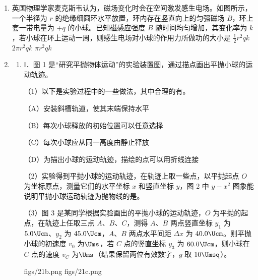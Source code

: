 \documentclass[\gkver]{gaokaozhenti}
\begin{document}
\begin{enumerate}
\item
英国物理学家麦克斯韦认为，磁场变化时会在空间激发感生电场。如图所示，一个半径为 $r$ 的绝缘细圆环水平放置，环内存在竖直向上的匀强磁场 $B$，环上套一带电量为 $+q$ 的小球。已知磁感应强度 $B$ 随时间均匀增加，其变化率为 $k$，若小球在环上运动一周，则感生电场对小球的作用力所做功的大小是
\onepicture[align=right, w=3.37cm]{}
{$\frac{1}{2}r^{2}qk$}
{$2\pi r^{2}qk$}
{$\pi r^{2}qk$}

\item
\begin{enumerate}
	\item
	Ⅰ．图 1 是“研究平抛物体运动”的实验装置图，通过描点画出平抛小球的运动轨迹。

	（1）以下是实验过程中的一些做法，其中合理的有。

	（A）安装斜槽轨道，使其末端保持水平

	（B）每次小球释放的初始位置可以任意选择

	（C）每次小球应从同一高度由静止释放

	（D）为描出小球的运动轨迹，描绘的点可以用折线连接

	（2）实验得到平抛小球的运动轨迹，在轨迹上取一些点，以平抛起点 $O$ 为坐标原点，测量它们的水平坐标 $x$ 和竖直坐标 $y$，图 2 中 $y-x^{2}$ 图象能说明平抛小球运动轨迹为抛物线的是。

	（3）图 3 是某同学根据实验画出的平抛小球的运动轨迹，$O$ 为平抛的起点，在轨迹上任取三点 $A$、$B$、$C$，测得 $A$、$B$ 两点竖直坐标 $y_{1}$ 为 $5.0\Ucm$、$y_{2}$ 为 $45.0\Ucm$，$A$、$B$ 两点水平间距 $\Delta x$ 为 $40.0\Ucm$。则平抛小球的初速度 $v_{0}$ 为$\Ums$，若 $C$ 点的竖直坐标 $y_{3}$ 为 $60.0\Ucm$，则小球在 $C$ 点的速度 $v_{C}$ 为$\Ums$（结果保留两位有效数字，$g$ 取 $10\Umsq$）。

	{figs/21b.png}
	{figs/21c.png}


\end{enumerate}
\end{enumerate}
\end{document}
